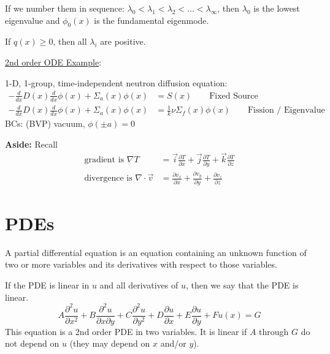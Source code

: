 \documentclass[12pt]{article}
\newcommand{\Macro}{\ensuremath{\Sigma}}
\begin{document}
If we number them in sequence: $\lambda_0 < \lambda_1 < \lambda_2 < \dots < \lambda_{\infty}$, then $\lambda_0$ is the lowest eigenvalue and $\phi_0(x)$ is the fundamental eigenmode. 

If $q(x) \geq 0$, then all $\lambda_i$ are positive.

\vspace*{1em}
\underline{2nd order ODE Example}:

1-D, 1-group, time-independent neutron diffusion equation:
%
\begin{align}
-\frac{d}{dx}D(x)\frac{d}{dx}\phi(x) + \Macro_a(x)\phi(x) &= S(x) \qquad \text{Fixed Source} \nonumber \\
-\frac{d}{dx}D(x)\frac{d}{dx}\phi(x) + \Macro_a(x)\phi(x) &= \frac{1}{k} \nu \Macro_f(x) \phi(x)\qquad \text{Fission / Eigenvalue} \nonumber
\end{align}
%
BCs: (BVP) vacuum, $\phi(\pm a) = 0$


\textbf{Aside:} Recall
%
\begin{align}
\text{gradient is } \nabla T &= \vec{i}\frac{\partial T}{\partial x} + \vec{j}\frac{\partial T}{\partial y} + \vec{k}\frac{\partial T}{\partial z} \nonumber \\
%
\text{divergence is } \nabla \cdot \vec{v} &= \frac{\partial v_x}{\partial x} + \frac{\partial v_y}{\partial y} + \frac{\partial v_z}{\partial z} \nonumber
\end{align}

\section{PDEs}

A partial differential equation is an equation containing an unknown function of two or more variables and its derivatives with respect to those variables. 

If the PDE is linear in $u$ and all derivatives of $u$, then we say that the PDE is linear.
%
\begin{equation}
A\frac{\partial^2 u}{\partial x^2} + B\frac{\partial^2 u}{\partial x \partial  y} + C\frac{\partial^2 u}{\partial y^2} + D\frac{\partial u}{\partial x} + E\frac{\partial u}{\partial y} + Fu(x) = G \nonumber
\end{equation}
%
This equation is a 2nd order PDE in two variables. It is linear if $A$ through $G$ do not depend on $u$ (they may depend on $x$ and/or $y$). 
\end{document}
